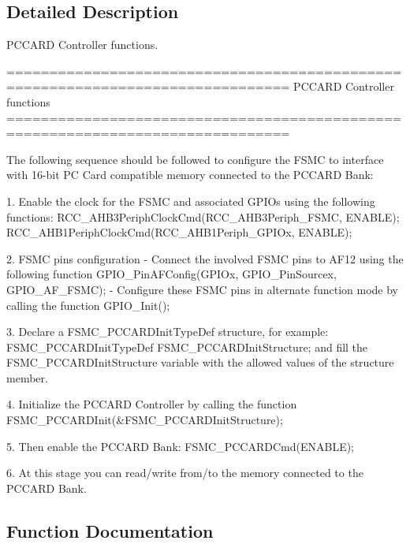 \subsection{Detailed Description}
P\+C\+C\+A\+R\+D Controller functions. 

\begin{DoxyVerb} ===============================================================================
                    PCCARD Controller functions
 ===============================================================================  

 The following sequence should be followed to configure the FSMC to interface with
 16-bit PC Card compatible memory connected to the PCCARD Bank:
 
   1. Enable the clock for the FSMC and associated GPIOs using the following functions:
          RCC_AHB3PeriphClockCmd(RCC_AHB3Periph_FSMC, ENABLE);
          RCC_AHB1PeriphClockCmd(RCC_AHB1Periph_GPIOx, ENABLE);

   2. FSMC pins configuration 
       - Connect the involved FSMC pins to AF12 using the following function 
          GPIO_PinAFConfig(GPIOx, GPIO_PinSourcex, GPIO_AF_FSMC); 
       - Configure these FSMC pins in alternate function mode by calling the function
          GPIO_Init();    
       
   3. Declare a FSMC_PCCARDInitTypeDef structure, for example:
          FSMC_PCCARDInitTypeDef  FSMC_PCCARDInitStructure;
      and fill the FSMC_PCCARDInitStructure variable with the allowed values of
      the structure member.
      
   4. Initialize the PCCARD Controller by calling the function
          FSMC_PCCARDInit(&FSMC_PCCARDInitStructure); 

   5. Then enable the PCCARD Bank:
          FSMC_PCCARDCmd(ENABLE);  

   6. At this stage you can read/write from/to the memory connected to the PCCARD Bank. \end{DoxyVerb}
 

\subsection{Function Documentation}
\hypertarget{group___f_s_m_c___group3_ga2d410151ceb3428c6a1bf374a0472cde}{}

